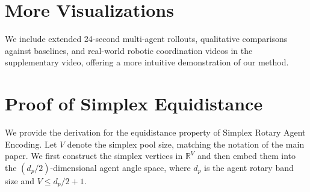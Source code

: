 \documentclass{llmxive}
\begin{document}
\appendix
\section{More Visualizations}
We include extended 24-second multi-agent rollouts, qualitative comparisons against baselines, and real-world robotic coordination videos in the supplementary video, offering a more intuitive demonstration of our method.

\section{Proof of Simplex Equidistance}
\label{app:simplex-equidistance}

We provide the derivation for the equidistance property of Simplex Rotary Agent Encoding. 
Let $V$ denote the simplex pool size, matching the notation of the main paper.
We first construct the simplex vertices in $\mathbb{R}^{V}$ and then embed them into the $(d_p/2)$-dimensional agent angle space, where $d_p$ is the agent rotary band size and $V\leq d_p/2+1$.
\end{document}
